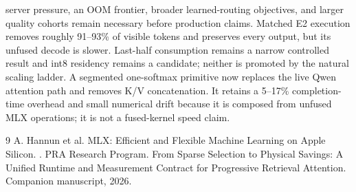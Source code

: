 \documentclass[10pt]{article}
\begin{document}
 server pressure, an OOM frontier, broader learned-routing objectives, and
 larger quality cohorts remain necessary before production claims. Matched E2
 execution removes roughly 91--93\% of visible
tokens and preserves every output, but its unfused decode is slower. Last-half
consumption remains a narrow controlled result and int8 residency remains a
candidate; neither is promoted by the natural scaling ladder. A segmented one-softmax primitive
now replaces the live Qwen attention path and removes K/V concatenation. It
retains a 5--17\% completion-time overhead and small numerical drift because it
is composed from unfused MLX operations; it is not a fused-kernel speed claim.

\begin{thebibliography}{9}
A. Hannun et al.
\newblock MLX: Efficient and Flexible Machine Learning on Apple Silicon.
.
PRA Research Program.
\newblock From Sparse Selection to Physical Savings: A Unified Runtime and
Measurement Contract for Progressive Retrieval Attention.
\newblock Companion manuscript, 2026.
\end{thebibliography}
\end{document}
